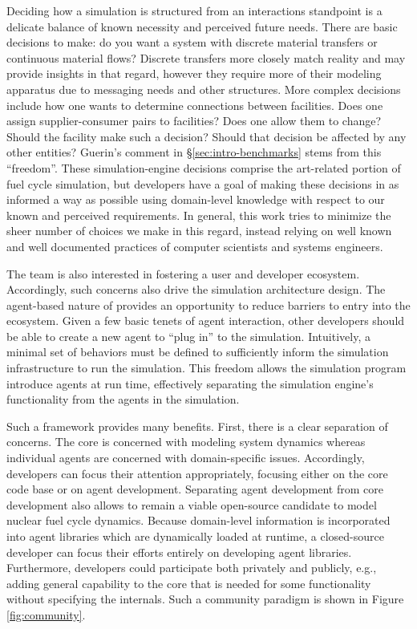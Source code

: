 Deciding how a simulation is structured from an interactions standpoint is a
delicate balance of known necessity and perceived future needs. There are basic
decisions to make: do you want a system with discrete material transfers or
continuous material flows? Discrete transfers more closely match reality and may
provide insights in that regard, however they require more of their modeling
apparatus due to messaging needs and other structures. More complex decisions
include how one wants to determine connections between facilities. Does one
assign supplier-consumer pairs to facilities? Does one allow them to change?
Should the facility make such a decision? Should that decision be affected by
any other entities? Guerin's comment in \S\ref{sec:intro-benchmarks} stems from
this ``freedom''. These simulation-engine decisions comprise the art-related
portion of fuel cycle simulation, but developers have a goal of making these
decisions in as informed a way as possible using domain-level knowledge with
respect to our known and perceived requirements. In general, this work tries to
minimize the sheer number of choices we make in this regard, instead relying on
well known and well documented practices of computer scientists and systems
engineers.

The \Cyclus team is also interested in fostering a user and developer ecosystem.
Accordingly, such concerns also drive the simulation architecture design. The
agent-based nature of \Cyclus provides an opportunity to reduce barriers to
entry into the ecosystem. Given a few basic tenets of agent interaction, other
developers should be able to create a new agent to ``plug in'' to the
simulation. Intuitively, a minimal set of behaviors must be defined to
sufficiently inform the simulation infrastructure to run the simulation. This
freedom allows the simulation program introduce agents at run time, effectively
separating the simulation engine's functionality from the agents in the
simulation.

Such a framework provides many benefits. First, there is a clear separation of
concerns. The \Cyclus core is concerned with modeling system dynamics whereas
individual agents are concerned with domain-specific issues. Accordingly,
developers can focus their attention appropriately, focusing either on the core
code base or on agent development. Separating agent development from core
development also allows \Cyclus to remain a viable open-source candidate to
model nuclear fuel cycle dynamics. Because domain-level information is
incorporated into agent libraries which are dynamically loaded at runtime, a
closed-source developer can focus their efforts entirely on developing agent
libraries. Furthermore, developers could participate both privately and
publicly, e.g., adding general capability to the \Cyclus core that is needed for
some functionality without specifying the internals. Such a community paradigm
is shown in Figure \ref{fig:community}.

